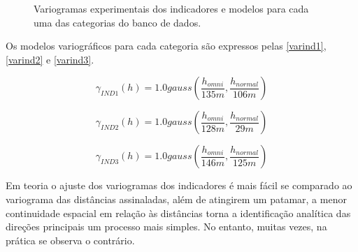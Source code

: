 \begin{figure} 
     \caption{Variogramas experimentais dos indicadores e modelos para cada uma das categorias do banco de dados.} \label{ind_var}
     \centering
\end{figure}

Os modelos variográficos para cada categoria são expressos pelas \autoref{varind1}, \autoref{varind2} e \autoref{varind3}.

\begin{equation}
\label{varind1}
\gamma_{IND1}(h)=1.0gauss\left(\frac{h_{omni}}{135m}, \frac{h_{normal}}{106m}\right)
\end{equation}

\begin{equation}
\label{varind2}
\gamma_{IND2}(h)=1.0gauss\left(\frac{h_{omni}}{128m}, \frac{h_{normal}}{29m}\right)
\end{equation}

\begin{equation}
\label{varind3}
\gamma_{IND3}(h)=1.0gauss\left(\frac{h_{omni}}{146m}, \frac{h_{normal}}{125m}\right)
\end{equation}

Em teoria o ajuste dos variogramas dos indicadores é mais fácil se comparado ao variograma das distâncias assinaladas, além de atingirem um patamar, a menor continuidade espacial em relação às distâncias torna a identificação analítica das direções principais um processo mais simples. No entanto, muitas vezes, na prática se observa o contrário.

